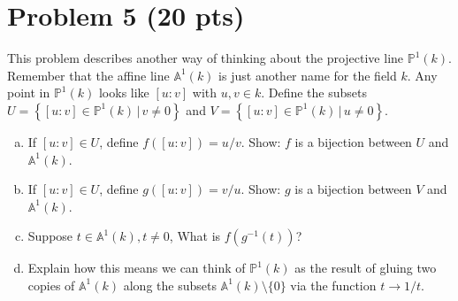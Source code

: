 \documentclass[12pt]{article}
\newcommand{\lb}{\left[}
\newcommand{\rb}{\right]}
\newcommand{\lc}{\left\{}
\newcommand{\rc}{\right\}}
\begin{document}
%




\newpage


\section*{Problem 5 \small{(20 pts)}} 


This problem describes another way of thinking about the projective line $\mathbb{P}^1(k)$. Remember that the affine line $\mathbb{A}^1(k)$ is just another name for the field $k$. Any point in $\mathbb{P}^1(k)$ looks like $[u:v]$ with $u,v \in k$. Define the subsets
$ U = \lc [u:v]\in \mathbb{P}^1(k) \,\vert\, v \neq 0  \rc$ and
$ V = \lc [u:v]\in \mathbb{P}^1(k) \,\vert\, u \neq 0  \rc.$
\begin{enumerate}[(a)]
	\item If $[u:v] \in U$, define $f([u:v]) = u/v$. Show: $f$ is a bijection between $U$ and $\mathbb{A}^1(k)$. 
	\item If $[u:v] \in U$, define $g([u:v]) = v/u$. Show: $g$ is a bijection between $V$ and $\mathbb{A}^1(k)$. 
	\item Suppose $t \in \mathbb{A}^1(k), t\neq 0$, What is $f(g^{-1}(t))$?
	\item Explain how this means we can think of $\mathbb{P}^1(k)$ as the result of gluing two copies of $\mathbb{A}^1(k)$ along the subsets $\mathbb{A}^1(k)\setminus \{0\}$ via the function $t \to 1/t$. 
\end{enumerate}
\end{document}
